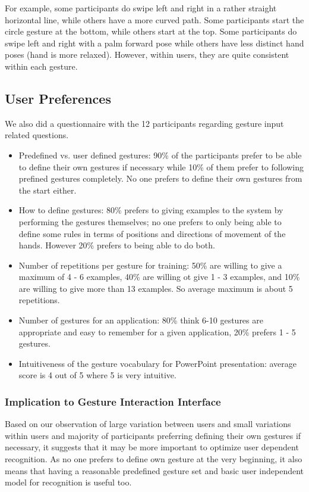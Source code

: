\documentclass[conference]{IEEEtran}
\begin{document}
For example, some participants do swipe left and right in a rather straight
horizontal line, while others have a more curved path. Some participants start
the circle gesture at the bottom, while others start at the top. Some
participants do swipe left and right with a palm forward pose while others have
less distinct hand poses (hand is more relaxed). However, within users, they are
quite consistent within each gesture. 

\subsection{User Preferences}
We also did a questionnaire with the 12 participants regarding gesture input
related questions. 

\begin{itemize}
  \item Predefined vs. user defined gestures: 90\% of the participants prefer to
  be able to define their own gestures if necessary while 10\% of them prefer to following prefined
gestures completely. No one prefers to define their own gestures from the start
either.
\item How to define gestures: 80\% prefers to giving examples to the system by
performing the gestures themselves; no one prefers to only being able to
define some rules in terms of positions and directions of movement of the hands.
However 20\% prefers to being able to do both.
\item Number of repetitions per gesture for training: 50\% are willing to give a
maximum of 4 - 6 examples, 40\% are willing ot give 1 - 3 examples, and 10\% are
willing to give more than 13 examples. So average maximum is about 5
repetitions.
\item Number of gestures for an application: 80\% think 6-10 gestures are
appropriate and easy to remember for a given application, 20\% prefers 1 - 5
gestures.
\item Intuitiveness of the gesture vocabulary for PowerPoint presentation:
average score is 4 out of 5 where 5 is very intuitive.
\end{itemize}

\subsubsection{Implication to Gesture Interaction Interface}
Based on our observation of large variation between users and small variations
within users and majority of participants preferring defining their own gestures
if necessary, it suggests that it may be more important to optimize user
dependent recognition. As no one prefers to define own gesture at the very
beginning, it also means that having a reasonable predefined gesture set and
basic user independent model for recognition is useful too.
\end{document}
